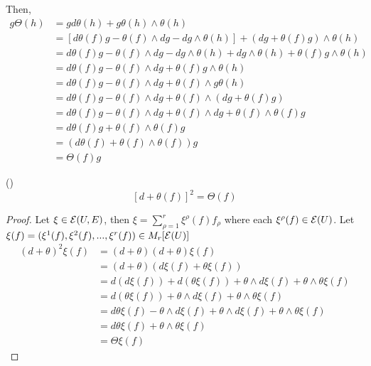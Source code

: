 \begin{lemma}
\begin{longproof}
\begin{enumerate}
			Then,
			\begin{align*}
				g \Theta(h)
				&= g d\theta(h) + g \theta(h) \wedge \theta(h) \\
				&= [d \theta(f) g - \theta(f) \wedge dg - dg \wedge \theta(h)] + (dg + \theta(f) g) \wedge \theta(h) \\
				&= d \theta(f) g - \theta(f) \wedge dg - dg \wedge \theta(h) + dg  \wedge \theta(h) + \theta(f) g \wedge \theta(h) \\
				&= d \theta(f) g - \theta(f) \wedge dg + \theta(f) g \wedge \theta(h) \\
				&= d \theta(f) g - \theta(f) \wedge dg + \theta(f) \wedge g \theta(h) \\
				&= d \theta(f) g - \theta(f) \wedge dg + \theta(f) \wedge (dg + \theta(f) g) \\
				&= d \theta(f) g - \theta(f) \wedge dg + \theta(f) \wedge dg + \theta(f) \wedge \theta(f) g \\
				&= d \theta(f) g + \theta(f) \wedge \theta(f) g \\
				&= (d \theta(f) + \theta(f) \wedge \theta(f))g \\
				&= \Theta(f) g
			\end{align*}
		\end{enumerate}
	\end{longproof}
\end{lemma}

\begin{lemma}
	()
	$$
		[d + \theta(f)]^2 = \Theta(f)
	$$
	\begin{proof}
		Let $\xi \in \mathcal{E}(U, E)$, then $\xi = \sum_{\rho=1}^r \xi^\rho(f) f_\rho$ where each $\xi^\rho(f) \in \mathcal{E}(U)$. Let $\xi(f) = (\xi^1(f), \xi^2(f), ..., \xi^r(f)) \in M_r[\mathcal{E}(U)]$		
		\begin{align*}
			(d + \theta)^2 \xi(f)
			&= (d + \theta)(d + \theta) \xi(f) \\
			&= (d + \theta)(d \xi(f) + \theta \xi(f)) \\
			&= d (d \xi(f)) + d (\theta \xi(f)) + \theta \wedge d \xi(f) + \theta \wedge \theta \xi(f) \\
			&= d (\theta \xi(f)) + \theta \wedge d \xi(f) + \theta \wedge \theta \xi(f) \\
			&= d \theta \xi(f) - \theta \wedge d \xi(f) + \theta \wedge d \xi(f) + \theta \wedge \theta \xi(f) \\
			&= d \theta \xi(f) + \theta \wedge \theta \xi(f) \\
			&= \Theta \xi(f)
		\end{align*}
	\end{proof}
\end{lemma}

